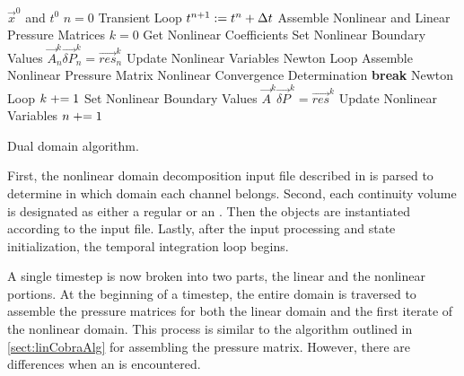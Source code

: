 \begin{algo}[ht!]
\setlength{\baselineskip}{0.625\baselineskip}
\begin{algorithmic}[1]
\Require $\vec{x}^{0}$ and $t^{0}$
\Set $n = 0$
\Loop \; Transient Loop
    \Set $t^{n+1} : = t^{n} + \dt{}$
	\Algorithm Assemble Nonlinear and Linear Pressure Matrices	 
	    \Set $k = 0$
		\Algorithm Get Nonlinear Coefficients 
		\Algorithm Set Nonlinear Boundary Values 
		\Solve $\vec{A}^{k}_{n} \vec{\delta P}_{n}^{k} = \vec{res}_{n}^{k}$	
		\Algorithm Update Nonlinear Variables  
	    \Loop \; Newton Loop
			\Algorithm Assemble Nonlinear Pressure Matrix 
			\Algorithm Nonlinear Convergence Determination 
				\State \textbf{break} Newton Loop 
			\EndIf		
			\Set $k \mathrel{+}= 1$
			\Algorithm Set Nonlinear Boundary Values 
			\Solve $\vec{A}^{k} \vec{\delta P}^{k} = \vec{res}^{k}$
			\Algorithm Update Nonlinear Variables 
		\EndLoop
	\EndIf
	 
	\Set $n \mathrel{+}= 1$
\EndLoop
\end{algorithmic}
\caption{Dual domain \cobra{} algorithm.}
\label{alg:domDecompAlgorithm}
\end{algo}

First, the nonlinear domain decomposition input file described in  is parsed to determine in which domain each channel belongs.
Second, each continuity volume is designated as either a regular  or an .
Then the   objects are instantiated according to the \cobra{} input file.
Lastly, after the input processing and state initialization, the temporal integration loop begins.

A single timestep is now broken into two parts, the linear and the nonlinear portions.
At the beginning of a timestep, the entire domain is traversed to assemble the pressure matrices for both the linear domain and the first iterate of the nonlinear domain.
This process is similar to the algorithm outlined in \ref{sect:linCobraAlg} for assembling the pressure matrix.
However, there are differences when an  is encountered.

